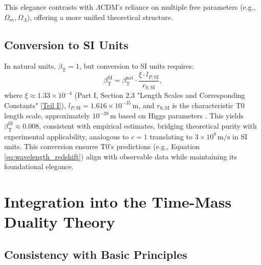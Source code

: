 \documentclass[12pt,a4paper]{article}
\newcommand{\betaT}{\beta_{\text{T}}}
\begin{document}
	This elegance contrasts with \(\Lambda\)CDM’s reliance on multiple free parameters (e.g., \(\Omega_m, \Omega_{\Lambda}\)), offering a more unified theoretical structure.
	
	\subsection{Conversion to SI Units}
	\label{subsec:conversion_si}
	
	In natural units, \(\betaT = 1\), but conversion to SI units requires:
	\begin{equation}
		\betaT^{\text{SI}} = \betaT^{\text{nat}} \cdot \frac{\xi \cdot l_{P,\text{SI}}}{r_{0,\text{SI}}},
		\label{eq:beta_conversion}
	\end{equation}
	where \(\xi \approx 1.33 \times 10^{-4}\) (Part I, Section 2.3 "Length Scales and Corresponding Constants" \href{https://github.com/jpascher/T0-Time-Mass-Duality/tree/main/2/pdf/English/QMRelTimeMassPart1En.pdf}{[Teil I]}), \(l_{P,\text{SI}} = 1.616 \times 10^{-35} \, \text{m}\), and \(r_{0,\text{SI}}\) is the characteristic T0 length scale, approximately \(10^{-39} \, \text{m}\) based on Higgs parameters \cite{pascher_alphabeta_2025}. This yields \(\betaT^{\text{SI}} \approx 0.008\), consistent with empirical estimates, bridging theoretical purity with experimental applicability, analogous to \(c = 1\) translating to \(3 \times 10^8 \, \text{m/s}\) in SI units. This conversion ensures T0’s predictions (e.g., Equation \ref{eq:wavelength_redshift}) align with observable data while maintaining its foundational elegance.
	
	\section{Integration into the Time-Mass Duality Theory}
	\label{sec:integration_t0}
	
	\subsection{Consistency with Basic Principles}
	\label{subsec:consistency_principles}
	
\end{document}
